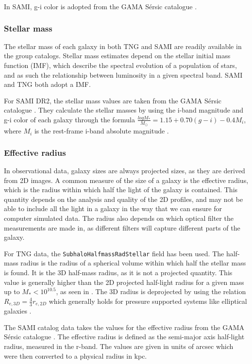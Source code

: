 In SAMI, g-i color is adopted from the GAMA Sérsic catalogue \parencite{Driver_2011}.

\subsubsection{Stellar mass}
The stellar mass of each galaxy in both TNG and SAMI are readily available in the group catalogs. Stellar mass estimates depend on the stellar initial mass function (IMF), which describe the spectral evolution of a population of stars, and as such the relationship between luminosity in a given spectral band. SAMI and TNG both adopt a \textcite{Chabrier_2003} IMF.

For SAMI DR2, the stellar mass values are taken from the GAMA Sérsic catalogue \parencite{Driver_2011}. They calculate the stellar masses by using the i-band magnitude and g-i color of each galaxy through the formula $\frac{log M_*}{M_\odot} = 1.15 + 0.70(g-i) -0.4M_i$, where $M_i$ is the rest-frame i-band absolute magnitude \parencite{Taylor_2011}.

\subsubsection{Effective radius}
In observational data, galaxy sizes are always projected sizes, as they are derived from 2D images. A common measure of the size of a galaxy is the effective radius, which is the radius within which half the light of the galaxy is contained. This quantity depends on the analysis and quality of the 2D profiles, and may not be able to include all the light in a galaxy in the way that we can ensure for computer simulated data. The radius also depends on which optical filter the measurements are made in, as different filters will capture different parts of the galaxy.

For TNG data, the \texttt{SubhaloHalfmassRadStellar} field has been used. The half-mass radius is the radius of a spherical volume within which half the stellar mass is found. It is the 3D half-mass radius, as it is not a projected quantity. This value is generally higher than the 2D projected half-light radius for a given mass up to $M_{*} < 10^{10.5}$, as seen in \parencite{Genel2017}. The 3D radius is deprojected by using the relation $R_{e, 3D} = \frac{4}{3}r_{e, 2D}$ which generally holds for pressure supported systems like elliptical galaxies \parencite{Wolf_2010}.

The SAMI catalog data takes the values for the effective radius from the GAMA Sérsic catalogue \parencite{Driver_2011}. The effective radius is defined as the semi-major axis half-light radius, measured in the r-band. The values are given in units of arcsec which were then converted to a physical radius in kpc.

